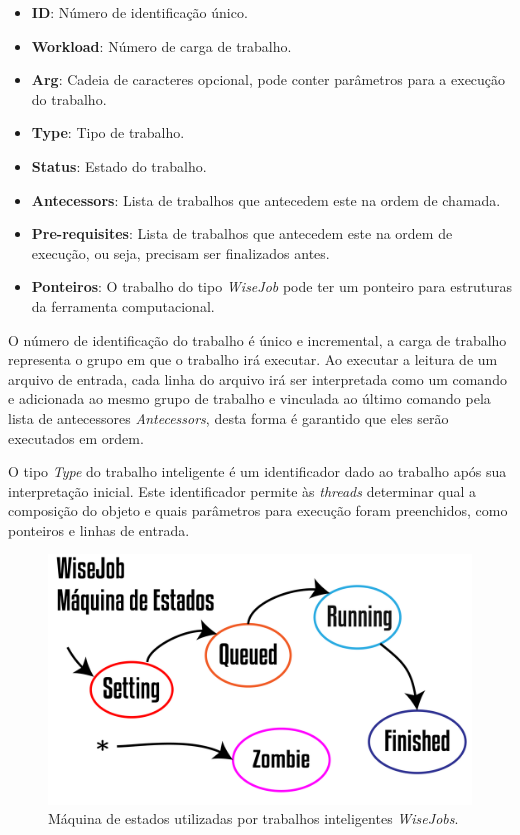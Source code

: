 \begin{itemize}
	\item \textbf{ID}: Número de identificação único.
	\item \textbf{Workload}: Número de carga de trabalho.
	\item \textbf{Arg}: Cadeia de caracteres opcional, pode conter parâmetros para a execução do trabalho.
	\item \textbf{Type}: Tipo de trabalho.
	\item \textbf{Status}: Estado do trabalho.
	\item \textbf{Antecessors}: Lista de trabalhos que antecedem este na ordem de chamada.
	\item \textbf{Pre-requisites}: Lista de trabalhos que antecedem este na ordem de execução, ou seja, precisam ser finalizados antes.
	\item \textbf{Ponteiros}: O trabalho do tipo \textit{WiseJob} pode ter um ponteiro para estruturas da ferramenta computacional.
\end{itemize}

O número de identificação do trabalho é único e incremental, a carga de trabalho representa o grupo em que o trabalho irá executar. Ao executar a leitura de um arquivo de entrada, cada linha do arquivo irá ser interpretada como um comando e adicionada ao mesmo grupo de trabalho e vinculada ao último comando pela lista de antecessores \textit{Antecessors}, desta forma é garantido que eles serão executados em ordem.

O tipo \textit{Type} do trabalho inteligente é um identificador dado ao trabalho após sua interpretação inicial. Este identificador permite às \textit{threads} determinar qual a composição do objeto e quais parâmetros para execução foram preenchidos, como ponteiros e linhas de entrada. 

\begin{figure}[!htbp]
	\centering
	\includegraphics[width=\linewidth]{Figures/WiseJobStatus@16x.png}
	\caption{Máquina de estados utilizadas por trabalhos inteligentes \textit{WiseJobs}.}
	\label{fig9:wise_jobs}
\end{figure}

